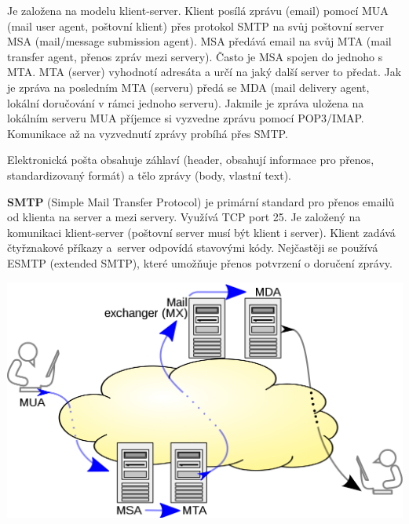 Je založena na modelu klient-server. Klient posílá zprávu (email) pomocí MUA (mail user agent, poštovní klient) přes protokol SMTP na svůj poštovní server MSA (mail/message submission agent). MSA předává email na svůj MTA (mail transfer agent, přenos zpráv mezi servery). Často je MSA spojen do jednoho s MTA. MTA (server) vyhodnotí adresáta a určí na jaký další server to předat. Jak je zpráva na posledním MTA (serveru) předá se MDA (mail delivery agent, lokální doručování v rámci jednoho serveru). Jakmile je zpráva uložena na lokálním serveru MUA příjemce si vyzvedne zprávu pomocí POP3/IMAP. Komunikace až na vyzvednutí zprávy probíhá přes SMTP.

Elektronická pošta obsahuje záhlaví (header, obsahují informace pro přenos, standardizovaný formát) a tělo zprávy (body, vlastní text).

\textbf{SMTP} (Simple Mail Transfer Protocol) je primární standard pro přenos emailů od klienta na server a mezi servery. Využívá TCP port 25. Je založený na komunikaci klient-server (poštovní server musí být klient i server). Klient zadává čtyřznakové příkazy a~server odpovídá stavovými kódy. Nejčastěji se používá ESMTP (extended SMTP), které umožňuje přenos potvrzení o doručení zprávy.


\begin{center}
    \includegraphics[scale = 0.2]{images/emailcom.png}
\end{center}
